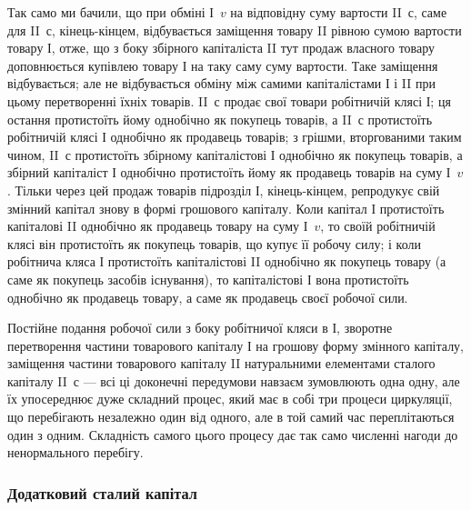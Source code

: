 Так само ми бачили, що при обміні І~$v$ на відповідну суму вартости
II~$с$, саме для II~$с$, кінець-кінцем, відбувається заміщення товару II
рівною сумою вартости товару І, отже, що з боку збірного капіталіста
II тут продаж власного товару доповнюється купівлею товару І на
таку саму суму вартости. Таке заміщення відбувається; але не відбувається
обміну між самими капіталістами І і II при цьому перетворенні
їхніх товарів. II~$с$ продає свої товари робітничій клясі І; ця остання
протистоїть йому однобічно як покупець товарів, а II~$с$ протистоїть робітничій
клясі І однобічно як продавець товарів; з грішми, вторгованими
таким чином, II~$с$ протистоїть збірному капіталістові І однобічно як покупець
товарів, а збірний капіталіст І однобічно протистоїть йому як продавець
товарів на суму І~$v$. Тільки через цей продаж товарів підрозділ І, кінець-кінцем,
репродукує свій змінний капітал знову в формі грошового капіталу.
Коли капітал І протистоїть капіталові II однобічно як продавець
товару на суму І~$v$, то своїй робітничій клясі він протистоїть як покупець
товарів, що купує її робочу силу; і коли робітнича кляса І протистоїть
капіталістові II однобічно як покупець товару (а саме як покупець
засобів існування), то капіталістові І вона протистоїть однобічно як продавець
товару, а саме як продавець своєї робочої сили.

Постійне подання робочої сили з боку робітничої кляси в І, зворотне
перетворення частини товарового капіталу І на грошову форму змінного
капіталу, заміщення частини товарового капіталу II натуральними елементами
сталого капіталу II~$с$ — всі ці доконечні передумови навзаєм зумовлюють
одна одну, але їх упосереднює дуже складний процес, який
має в собі три процеси циркуляції, що перебігають незалежно один від
одного, але в той самий час переплітаються один з одним. Складність самого
цього процесу дає так само численні нагоди до ненормального перебігу.

\subsubsection{Додатковий сталий капітал}

